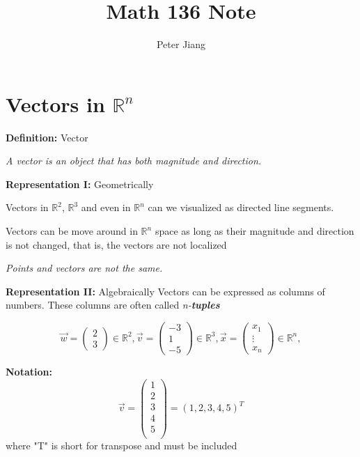 \documentclass{article}
\title{Math 136 Note}
\author{Peter Jiang}
\begin{document}
\maketitle

\newpage

\section{Vectors in $\mathbb{R}^n$ }

\textbf{Definition:} Vector

\begin{tcolorbox}
\emph{A vector is an object that has both magnitude and direction.}
\end{tcolorbox}

\textbf{Representation I:} Geometrically


Vectors in $\mathbb{R}^2$, $\mathbb{R}^3$ and even in $\mathbb{R}^n$
can we visualized as directed line segments.

Vectors can be move around in $\mathbb{R}^n$ space as long as their magnitude
and direction is not changed, that is, the vectors are not localized

\emph{Points and vectors are not the same.}

\medskip

\textbf{Representation II:} Algebraically
Vectors can be expressed as columns of numbers. These columns are often called \emph{n-\textbf{tuples}}

\[
    \vec{w} = 
    \begin{pmatrix} 
        2 \\
        3
    \end{pmatrix} \in \mathbb{R} ^ 2,
    \vec{v} = 
    \begin{pmatrix} 
        -3 \\
        1 \\
        -5
    \end{pmatrix} \in \mathbb{R} ^3,
    \vec{x} = 
    \begin{pmatrix} 
        x_1 \\
        \vdots \\
        x_n
    \end{pmatrix} \in \mathbb{R} ^ n,
\]

\medskip

\textbf{Notation:}
\[
    \vec{v} = \begin{pmatrix}
        1 \\
        2 \\
        3 \\
        4 \\
        5 \\

    \end{pmatrix} = (1, 2, 3, 4, 5)^T
\]
where "T" is short for transpose and must be included
\end{document}

